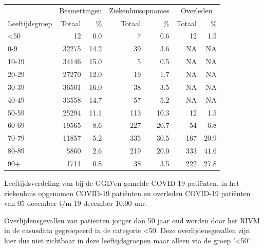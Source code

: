 \documentclass[
  english,
  man,floatsintext]{apa6}
\begin{document}
\begin{table}
\centering\begingroup\fontsize{11}{13}\selectfont

\begin{threeparttable}
\begin{tabular}{lrrrrrr}
\toprule
\multicolumn{1}{c}{ } & \multicolumn{2}{c}{Besmettingen} & \multicolumn{2}{c}{Ziekenhuisopnames} & \multicolumn{2}{c}{Overleden} \\
\cmidrule(l{3pt}r{3pt}){2-3} \cmidrule(l{3pt}r{3pt}){4-5} \cmidrule(l{3pt}r{3pt}){6-7}
Leeftijdsgroep & Totaal & \% & Totaal & \% & Totaal & \%\\
\midrule
<50 & 12 & 0.0 & 7 & 0.6 & 12 & 1.5\\
0-9 & 32275 & 14.2 & 39 & 3.6 & NA & NA\\
10-19 & 34146 & 15.0 & 5 & 0.5 & NA & NA\\
20-29 & 27270 & 12.0 & 19 & 1.7 & NA & NA\\
30-39 & 36501 & 16.0 & 38 & 3.5 & NA & NA\\
40-49 & 33558 & 14.7 & 57 & 5.2 & NA & NA\\
50-59 & 25294 & 11.1 & 113 & 10.3 & 12 & 1.5\\
60-69 & 19565 & 8.6 & 227 & 20.7 & 54 & 6.8\\
70-79 & 11857 & 5.2 & 335 & 30.5 & 167 & 20.9\\
80-89 & 5860 & 2.6 & 219 & 20.0 & 333 & 41.6\\
90+ & 1711 & 0.8 & 38 & 3.5 & 222 & 27.8\\
\bottomrule
\end{tabular}
\begin{tablenotes}
\item[1] Leeftijdsverdeling van bij de GGD’en gemelde COVID-19 patiënten, in het ziekenhuis opgenomen COVID-19 patiënten en overleden COVID-19 patiënten van 05 december t/m 19 december 10:00 uur.
\item[2] Overlijdensgevallen van patiënten jonger dan 50 jaar oud worden door het RIVM in de casusdata gegroepeerd in de categorie <50. Deze overlijdensgevallen zijn hier dus niet zichtbaar in deze leeftijdsgroepen maar alleen via de groep '<50'.
\end{tablenotes}
\end{threeparttable}
\endgroup{}
\end{table}

\newpage
\end{document}
